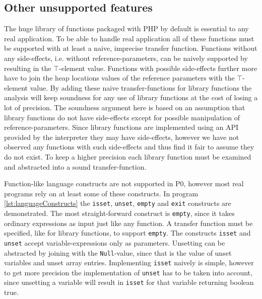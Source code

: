 \subsection{Other unsupported features}
The huge library of functions packaged with PHP by default is essential to any real application. To be able to handle real application all of these functions must be supported with at least a naive, imprecise transfer function. Functions without any side-effects, i.e. without reference-parameters, can be naively supported by resulting in the $\top$-element value. Functions with possible side-effects further more have to join the heap locations values of the reference parameters with the $\top$-element value. By adding these naive transfer-functions for library functions the analysis will keep soundness for any use of library functions at the cost of losing a lot of precision. The soundness argument here is based on an assumption that library functions do not have side-effects except for possible manipulation of reference-parameters. Since library functions are implemented using an API provided by the interpreter they may have side-effects, however we have not observed any functions with such side-effects and thus find it fair to assume they do not exist. To keep a higher precision each library function must be examined and abstracted into a sound transfer-function.

Function-like language constructs are not supported in P0, however most real programs rely on at least some of these constructs. In program \ref{lst:languageConstructs} the \texttt{isset}, \texttt{unset}, \texttt{empty} and \texttt{exit} constructs are demonstrated. The most straight-forward construct is \texttt{empty}, since it takes ordinary expressions as input just like any function. A transfer function must be specified, like for library functions, to support \texttt{empty}. The constructs \texttt{isset} and \texttt{unset} accept variable-expressions only as parameters. Unsetting can be abstracted by joining with the \texttt{Null}-value, since that is the value of unset variables and unset array entries. Implementing \texttt{isset} naively is simple, however to get more precision the implementation of \texttt{unset} has to be taken into account, since unsetting a variable will result in \texttt{isset} for that variable returning boolean true. 

